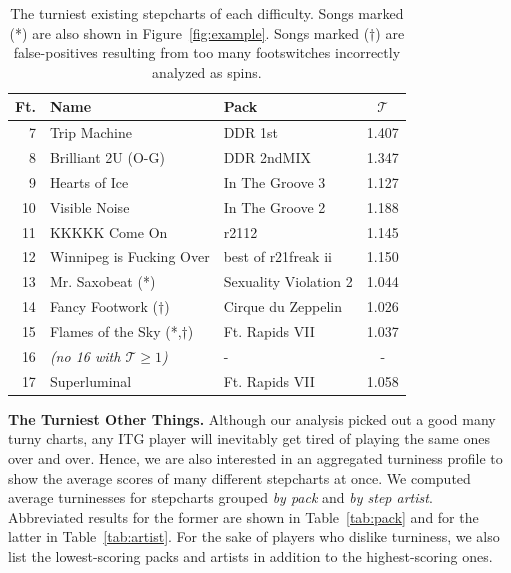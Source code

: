 \documentclass[10pt]{sigplanconf}
\begin{document}
\begin{table}[t]
	\begin{center}
		\small
	\begin{tabular}{r|l|l|c}
		Ft. & Name & Pack & $\mathcal{T}$ \\
		\hline
		7 & Trip Machine & DDR 1st & 1.407 \\
		8 & Brilliant 2U (O-G) & DDR 2ndMIX & 1.347 \\
		9 & Hearts of Ice & In The Groove 3 & 1.127 \\
		10 & Visible Noise & In The Groove 2 & 1.188 \\
		11 & KKKKK Come On & r2112 & 1.145 \\
		12 & Winnipeg is Fucking Over & best of r21freak ii & 1.150 \\
		13 & Mr. Saxobeat (*) & Sexuality Violation 2 & 1.044 \\
		14 & Fancy Footwork ($\dagger$) & Cirque du Zeppelin & 1.026 \\
		15 & Flames of the Sky (*,$\dagger$) & Ft. Rapids VII &  1.037 \\
		16 & {\em (no 16 with $\mathcal{T}\ge 1$)} & - & - \\
		17 & Superluminal & Ft. Rapids VII & 1.058 \\
	\end{tabular}
	\end{center}
	\caption{The turniest existing stepcharts of each difficulty. Songs marked (*) are also shown in Figure~\ref{fig:example}. Songs marked ($\dagger$) are false-positives resulting from too many footswitches incorrectly analyzed as spins.}
	\label{tab:feets}
\end{table}

{\bf The Turniest Other Things.}
Although our analysis picked out a good many turny charts, any ITG player will inevitably get tired of playing the same ones over and over.
Hence, we are also interested in an aggregated turniness profile to show the average scores of many different stepcharts at once.
We computed average turninesses for stepcharts grouped {\em by pack} and {\em by step artist}.
Abbreviated results for the former are shown in Table~\ref{tab:pack} and for the latter in Table~\ref{tab:artist}.
For the sake of players who dislike turniness, we also list the lowest-scoring packs and artists in addition to the highest-scoring ones.
\end{document}
